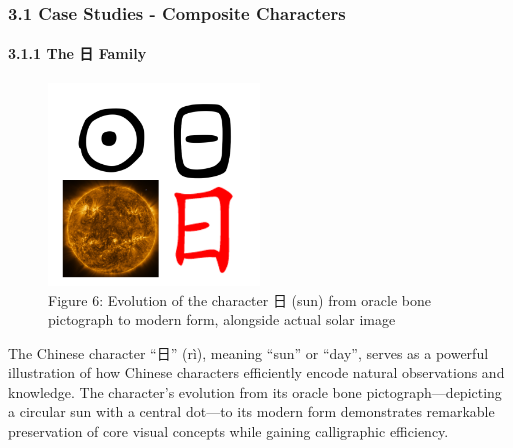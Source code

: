 \documentclass[
  11pt,
  letterpaper,
]{article}
\begin{document}
\subsubsection{3.1 Case Studies - Composite
Characters}\label{case-studies---composite-characters}

\paragraph{3.1.1 The 日 Family}\label{the-ux65e5-family}

\begin{figure}
\centering
\includegraphics[width=0.5\textwidth]{./images/zi_sun.png}
\caption{Figure 6: Evolution of the character 日 (sun) from oracle bone
pictograph to modern form, alongside actual solar image}
\end{figure}



The Chinese character ``日'' (rì), meaning ``sun'' or ``day'', serves as
a powerful illustration of how Chinese characters efficiently encode
natural observations and knowledge. The character's evolution from its
oracle bone pictograph---depicting a circular sun with a central
dot---to its modern form demonstrates remarkable preservation of core
visual concepts while gaining calligraphic efficiency.
\end{document}
